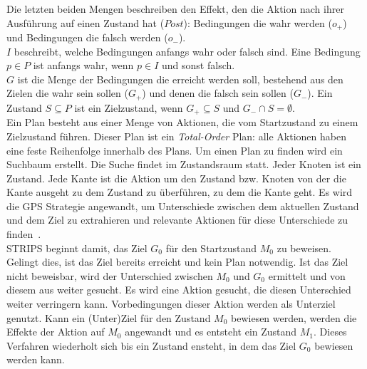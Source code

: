 Die letzten beiden Mengen beschreiben den Effekt, den die Aktion nach ihrer Ausführung auf einen Zustand hat ($Post$): Bedingungen die wahr werden ($o_+$) und Bedingungen die falsch werden ($o_-$).\\
$I$ beschreibt, welche Bedingungen anfangs wahr oder falsch sind.
Eine Bedingung $p\in P$ ist anfangs wahr, wenn $p\in I$ und sonst falsch.\\
$G$ ist die Menge der Bedingungen die erreicht werden soll, bestehend aus den Zielen die wahr sein sollen ($G_+$) und denen die falsch sein sollen ($G_-$).
Ein Zustand $S\subseteq P$  ist ein Zielzustand, wenn $G_+\subseteq S$ und $G_-\cap S =\emptyset$.\\
Ein Plan besteht aus einer Menge von Aktionen, die vom Startzustand zu einem Zielzustand führen.
Dieser Plan ist ein \emph{Total-Order} Plan: alle Aktionen haben eine feste Reihenfolge innerhalb des Plans.
Um einen Plan zu finden wird ein Suchbaum erstellt.
Die Suche findet im Zustandsraum statt.
Jeder Knoten ist ein Zustand.
Jede Kante ist die Aktion um den Zustand bzw. Knoten von der die Kante ausgeht zu dem Zustand zu überführen, zu dem die Kante geht.
Es wird die GPS Strategie angewandt, um Unterschiede zwischen dem aktuellen Zustand und dem Ziel zu extrahieren und relevante Aktionen für diese Unterschiede zu finden~\cite{FIKES1971189}.\\
\ac{STRIPS} beginnt damit, das Ziel $G_0$ für den Startzustand $M_0$ zu beweisen.
Gelingt dies, ist das Ziel bereits erreicht und kein Plan notwendig.
Ist das Ziel nicht beweisbar, wird der Unterschied zwischen $M_0$ und $G_0$ ermittelt und von diesem aus weiter gesucht.
Es wird eine Aktion gesucht, die diesen Unterschied weiter verringern kann.
Vorbedingungen dieser Aktion werden als Unterziel genutzt.
Kann ein (Unter)Ziel für den Zustand $M_0$ bewiesen werden, werden die Effekte der Aktion auf $M_0$ angewandt und es entsteht ein Zustand $M_1$.
Dieses Verfahren wiederholt sich bis ein Zustand ensteht, in dem das Ziel $G_0$ bewiesen werden kann.
